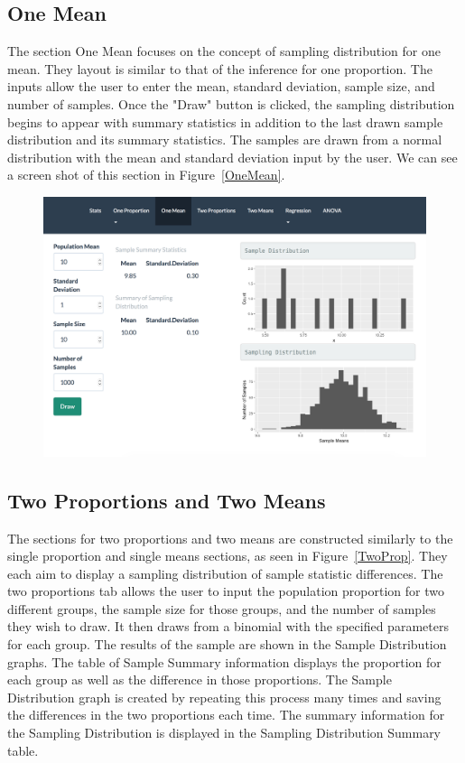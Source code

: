 \documentclass[11pt]{book}
\begin{document}
\newpage
\subsection{One Mean}
The section One Mean focuses on the concept of sampling distribution for one mean. They layout is similar to that of the inference for one proportion.  The inputs allow the user to enter the mean, standard deviation, sample size, and number of samples.  Once the "Draw" button is clicked, the sampling distribution begins to appear with summary statistics in addition to the last drawn sample distribution and its summary statistics. The samples are drawn from a normal distribution with the mean and standard deviation input by the user.   We can see a screen shot of this section in Figure~\ref{OneMean}.


\begin{figure}
\centering
        \includegraphics[width=\textwidth]{OneMean.png}
        \label{fig: OneMean}
\end{figure}

\subsection{Two Proportions and Two Means}

The sections for two proportions and two means are constructed similarly to the single proportion and single means sections, as seen in Figure~\ref{TwoProp}.  They each aim to display a sampling distribution of sample statistic differences. The two proportions tab allows the user to input the population proportion for two different groups, the sample size for those groups, and the number of samples they wish to draw. It then draws from a binomial with the specified parameters for each group. The results of the sample are shown in the Sample Distribution graphs. The table of Sample Summary information displays the proportion for each group as well as the difference in those proportions. The Sample Distribution graph is created by repeating this process many times and saving the differences in the two proportions each time. The summary information for the Sampling Distribution is displayed in the Sampling Distribution Summary table.
\end{document}
